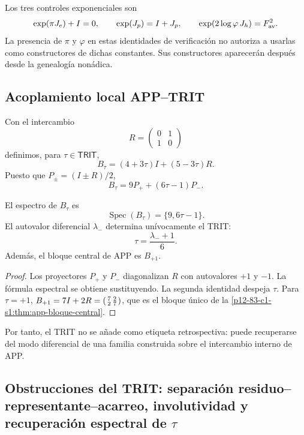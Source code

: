 Los tres controles exponenciales son
\[
 \exp(\pi J_e)+I=0,
 \qquad
 \exp(J_p)=I+J_p,
 \qquad
 \exp(2\log\varphi\,J_h)=F_{\rm av}^2.
\]
La presencia de \(\pi\) y \(\varphi\) en estas identidades de verificación
no autoriza a usarlas como constructores de dichas constantes. Sus
constructores aparecerán después desde la genealogía nonádica.

\subsection{Acoplamiento local APP--TRIT}

Con el intercambio
\[
 R=\begin{pmatrix}0&1\\1&0\end{pmatrix}
\]
definimos, para \(\tau\in\mathsf{TRIT}\),
\[
 B_\tau=(4+3\tau)I+(5-3\tau)R.
\]
Puesto que \(P_\pm=(I\pm R)/2\),
\[
 B_\tau=9P_++(6\tau-1)P_-.
\]

\begin{theorem}
\label{p12-83-c1-s11:thm:app-trit-recuperacion-espectral}
El espectro de \(B_\tau\) es
\[
 \operatorname{Spec}(B_\tau)=\{9,6\tau-1\}.
\]
El autovalor diferencial \(\lambda_-\) determina unívocamente el TRIT:
\[
 \tau=\frac{\lambda_-+1}{6}.
\]
Además, el bloque central de APP es \(B_{+1}\).
\end{theorem}

\begin{proof}
Los proyectores \(P_+\) y \(P_-\) diagonalizan \(R\) con autovalores
\(+1\) y \(-1\). La fórmula espectral se obtiene sustituyendo. La segunda
identidad despeja \(\tau\). Para \(\tau=+1\),
\(B_{+1}=7I+2R=\begin{psmallmatrix}7&2\\2&7\end{psmallmatrix}\), que es
el bloque único de la \cref{p12-83-c1-s1:thm:app-bloque-central}.
\end{proof}

Por tanto, el TRIT no se añade como etiqueta retrospectiva: puede recuperarse
del modo diferencial de una familia construida sobre el intercambio interno
de APP.

\subsection{Obstrucciones del TRIT: separación residuo–representante–acarreo, involutividad y recuperación espectral de \(\tau\)}

